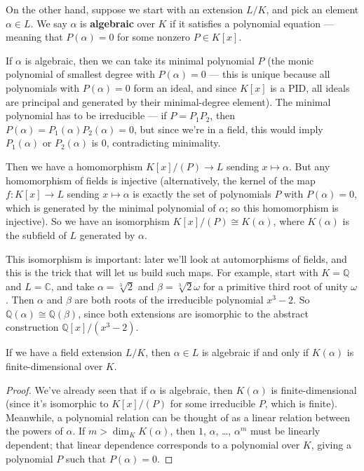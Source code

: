 On the other hand, suppose we start with an extension $L/K$, and pick an element $\alpha \in L$. We say $\alpha$ is \textbf{algebraic} over $K$ if it satisfies a polynomial equation --- meaning that $P(\alpha) = 0$ for some nonzero $P \in K[x]$. 

If $\alpha$ is algebraic, then we can take its minimal polynomial $P$ (the monic polynomial of smallest degree with $P(\alpha) = 0$ --- this is unique because all polynomials with $P(\alpha) = 0$ form an ideal, and since $K[x]$ is a PID, all ideals are principal and generated by their minimal-degree element). The minimal polynomial has to be irreducible --- if $P = P_1P_2$, then $P(\alpha) = P_1(\alpha)P_2(\alpha) = 0$, but since we're in a field, this would imply $P_1(\alpha)$ or $P_2(\alpha)$ is $0$, contradicting minimality. 

Then we have a homomorphism $K[x]/(P) \to L$ sending $x \mapsto \alpha$. But any homomorphism of fields is injective (alternatively, the kernel of the map $f : K[x] \to L$ sending $x \mapsto \alpha$ is exactly the set of polynomials $P$ with $P(\alpha) = 0$, which is generated by the minimal polynomial of $\alpha$; so this homomorphism is injective). So we have an isomorphism $K[x]/(P) \cong K(\alpha)$, where $K(\alpha)$ is the subfield of $L$ generated by $\alpha$. 

\begin{note}
    This isomorphism is important: later we'll look at automorphisms of fields, and this is the trick that will let us build such maps. For example, start with $K = \mathbb{Q}$ and $L = \mathbb{C}$, and take $\alpha = \sqrt[3]{2}$ and $\beta = \sqrt[3]{2}\omega$ for a primitive third root of unity $\omega$. Then $\alpha$ and $\beta$ are both roots of the irreducible polynomial $x^3 - 2$. So $\mathbb{Q}(\alpha) \cong \mathbb{Q}(\beta)$, since both extensions are isomorphic to the abstract construction $\mathbb{Q}[x]/(x^3 - 2)$. 
\end{note}

\begin{lemma}
    If we have a field extension $L/K$, then $\alpha \in L$ is algebraic if and only if $K(\alpha)$ is finite-dimensional over $K$. 
\end{lemma}

\begin{proof}
    We've already seen that if $\alpha$ is algebraic, then $K(\alpha)$ is finite-dimensional (since it's isomorphic to $K[x]/(P)$ for some irreducible $P$, which is finite). Meanwhile, a polynomial relation can be thought of as a linear relation between the powers of $\alpha$. If $m > \dim_K K(\alpha)$, then $1$, $\alpha$, \ldots, $\alpha^m$ must be linearly dependent; that linear dependence corresponds to a polynomial over $K$, giving a polynomial $P$ such that $P(\alpha) = 0$.
\end{proof}

